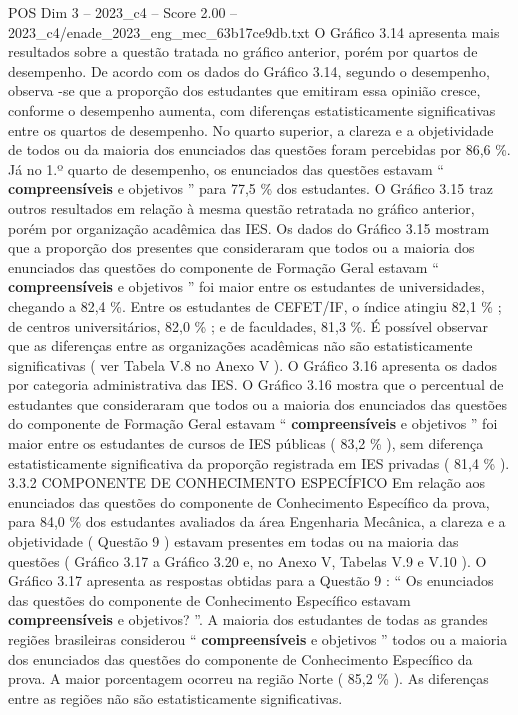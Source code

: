 \begin{textsample}{POS Dim 3 – 2023\_c4 – Score 2.00 – 2023\_c4/enade\_2023\_eng\_mec\_63b17ce9db.txt}
O Gráfico 3.14 apresenta mais resultados sobre a questão tratada no gráfico anterior, porém por quartos de desempenho.
De acordo com os dados do Gráfico 3.14, segundo o desempenho, observa -se que a proporção dos estudantes que emitiram essa opinião cresce, conforme o desempenho aumenta, com diferenças estatisticamente significativas entre os quartos de desempenho.
No quarto superior, a clareza e a objetividade de todos ou da maioria dos enunciados das questões foram percebidas por 86,6 \%.
Já no 1.º quarto de desempenho, os enunciados das questões estavam “ \textbf{compreensíveis} e objetivos ” para 77,5 \% dos estudantes.
O Gráfico 3.15 traz outros resultados em relação à mesma questão retratada no gráfico anterior, porém por organização acadêmica das IES.
Os dados do Gráfico 3.15 mostram que a proporção dos presentes que consideraram que todos ou a maioria dos enunciados das questões do componente de Formação Geral estavam “ \textbf{compreensíveis} e objetivos ” foi maior entre os estudantes de universidades, chegando a 82,4 \%.
Entre os estudantes de CEFET/IF, o índice atingiu 82,1 \% ; de centros universitários, 82,0 \% ; e de faculdades, 81,3 \%.
É possível observar que as diferenças entre as organizações acadêmicas não são estatisticamente significativas ( ver Tabela V.8 no Anexo V ).
O Gráfico 3.16 apresenta os dados por categoria administrativa das IES.
O Gráfico 3.16 mostra que o percentual de estudantes que consideraram que todos ou a maioria dos enunciados das questões do componente de Formação Geral estavam “ \textbf{compreensíveis} e objetivos ” foi maior entre os estudantes de cursos de IES públicas ( 83,2 \% ), sem diferença estatisticamente significativa da proporção registrada em IES privadas ( 81,4 \% ). 3.3.2 COMPONENTE DE CONHECIMENTO ESPECÍFICO Em relação aos enunciados das questões do componente de Conhecimento Específico da prova, para 84,0 \% dos estudantes avaliados da área Engenharia Mecânica, a clareza e a objetividade ( Questão 9 ) estavam presentes em todas ou na maioria das questões ( Gráfico 3.17 a Gráfico 3.20 e, no Anexo V, Tabelas V.9 e V.10 ).
O Gráfico 3.17 apresenta as respostas obtidas para a Questão 9 : “ Os enunciados das questões do componente de Conhecimento Específico estavam \textbf{compreensíveis} e objetivos? ”.
A maioria dos estudantes de todas as grandes regiões brasileiras considerou “ \textbf{compreensíveis} e objetivos ” todos ou a maioria dos enunciados das questões do componente de Conhecimento Específico da prova.
A maior porcentagem ocorreu na região Norte ( 85,2 \% ).
As diferenças entre as regiões não são estatisticamente significativas.

\end{textsample}
